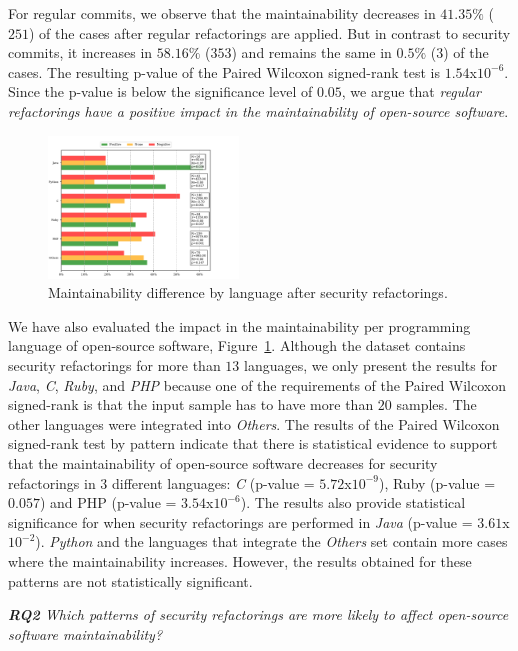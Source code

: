 \documentclass[10pt,conference]{IEEEtran}
\begin{document}
For regular commits, we observe that the maintainability decreases in $41.35\%$
($251$) of the cases after regular refactorings are applied. But in contrast
to security commits, it increases in $58.16\%$ ($353$) and remains the same in
$0.5\%$ ($3$) of the cases. The resulting p-value of the Paired Wilcoxon signed-rank
test is $1.54$x$10^{-6}$. Since the p-value is below the significance level of
$0.05$, we argue that \emph{regular refactorings have a
positive impact in the maintainability of open-source software}.

\begin{figure}[h]
  \centering
  \includegraphics[width=0.45\textwidth]{figures/language.pdf}
  \caption{Maintainability difference by language after security refactorings.}
  \label{fig:lang_main}
\end{figure}

We have also evaluated the impact in the maintainability per programming language
of open-source software, Figure~\ref{fig:lang_main}. Although
the dataset contains security refactorings for more than $13$ languages, we only
present the results for \emph{Java}, \emph{C}, \emph{Ruby}, and \emph{PHP}
because one of the requirements of the Paired Wilcoxon signed-rank is that the
input sample has to have more than $20$ samples. The other languages were
integrated into \emph{Others}. The results of the Paired Wilcoxon signed-rank
test by pattern indicate that there is statistical evidence to support that the
maintainability of open-source software decreases for security refactorings in
$3$ different languages: \emph{C} (p-value = $5.72$x$10^{-9}$), Ruby (p-value = $0.057$) and
PHP (p-value = $3.54$x$10^{-6}$). The results also provide statistical significance
for when security refactorings are performed in \emph{Java} (p-value =
$3.61$x$10^{-2}$). \emph{Python} and the languages that integrate the
\emph{Others} set contain more cases where the maintainability increases.
However, the results obtained for these patterns are not statistically
significant.

\begin{framed}
\textit{\textbf{RQ2} Which patterns of security refactorings are more likely to
affect open-source software maintainability?}
\end{framed}
\end{document}

